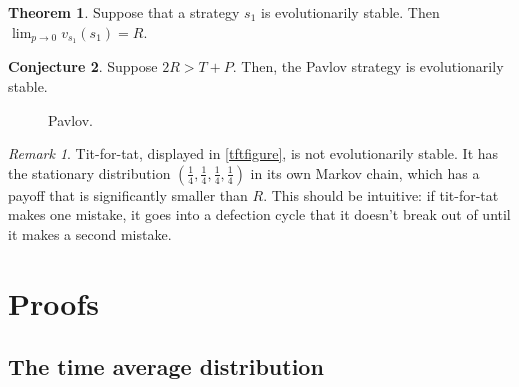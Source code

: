 \documentclass[11pt]{amsart}
\theoremstyle{definition}
\newtheorem{theorem}{Theorem}[section]
\newtheorem{conjecture}[theorem]{Conjecture}
\theoremstyle{remark}
\newtheorem*{remark}{Remark}
\begin{document}
\begin{theorem}
  \label{evolutionarystable1}
  Suppose that a strategy $s_1$ is evolutionarily stable. Then $\lim_{p \to 0} v_{s_1}(s_1) = R$.
\end{theorem}

\begin{conjecture}
  \label{pavlovtheorem}
  Suppose $2R > T + P$. Then, the Pavlov strategy is evolutionarily stable.
\end{conjecture}

\begin{figure}
  \label{pavlovfigure}
  \centering
  \caption{Pavlov.}
\end{figure}



\begin{remark}
  Tit-for-tat, displayed in \cref{tftfigure}, is not evolutionarily stable. It has the stationary distribution $(\frac{1}{4},\frac{1}{4},\frac{1}{4},\frac{1}{4})$ in its own Markov chain, which has a payoff that is significantly smaller than $R$. This should be intuitive: if tit-for-tat makes one mistake, it goes into a defection cycle that it doesn't break out of until it makes a second mistake.

\end{remark}


\section{Proofs}
\label{sectionproofs}

\subsection{The time average distribution}
\end{document}
